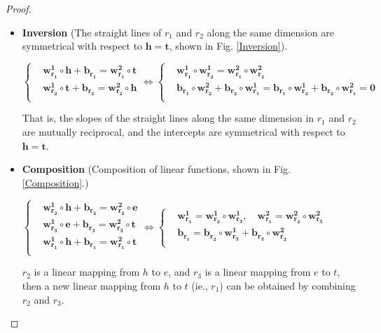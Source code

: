 \documentclass[conference]{IEEEtran}
\begin{document}
\begin{proof}
\begin{itemize}
		\item \textbf{Inversion} (The straight lines of $r_1$ and $r_2$ along the same dimension are symmetrical with respect to $\bm{h} = \bm{t}$, shown in Fig. \ref{Inversion}).
\begin{flushleft}
			$
			\left\{
			\begin{aligned}
			&\bm{w_{r_1}^{1}} \circ \bm{h} + \bm{b_{r_1}} = \bm{w_{r_1}^{2}} \circ \bm{t}  \\
			&\bm{w_{r_2}^{1}} \circ \bm{t} + \bm{b_{r_2}} = \bm{w_{r_2}^{2}} \circ \bm{h}  \\
			\end{aligned}
			\right.
			\Leftrightarrow
			\left\{
			\begin{aligned}
			&\bm{w_{r_1}^{1}} \circ \bm{w_{r_2}^{1}} =	\bm{w_{r_1}^{2}} \circ \bm{w_{r_2}^{2}}  \\
			&\bm{b_{r_1}} \circ \bm{w_{r_2}^{2}} + \bm{b_{r_2}} \circ \bm{w_{r_1}^{1}} = 
			\bm{b_{r_1}} \circ \bm{w_{r_2}^{1}} + \bm{b_{r_2}} \circ \bm{w_{r_1}^{2}} = \bm{0}  \\
			\end{aligned}
			\right.
			$
		\end{flushleft}
That is, the slopes of the straight lines along the same dimension in $r_1$ and $r_2$ are mutually reciprocal, and the intercepts are symmetrical with respect to $\bm{h} = \bm{t}$.
		
		\item \textbf{Composition} (Composition of linear functions, shown in Fig. \ref{Composition}.)
		\begin{flushleft}
			$
			\left\{
			\begin{aligned}
			&\bm{w_{r_2}^{1}} \circ \bm{h} + \bm{b_{r_2}} = \bm{w_{r_2}^{2}} \circ \bm{e}  \\
			&\bm{w_{r_3}^{1}} \circ \bm{e} + \bm{b_{r_3}} = \bm{w_{r_3}^{2}} \circ \bm{t}  \\
			&\bm{w_{r_1}^{1}} \circ \bm{h} + \bm{b_{r_1}} = \bm{w_{r_1}^{2}} \circ \bm{t}  \\
			\end{aligned}
			\right.
			\Leftrightarrow
			\left\{
			\begin{aligned}
			&\bm{w_{r_1}^{1}} = \bm{w_{r_2}^{1}} \circ \bm{w_{r_3}^{1}}, \quad \bm{w_{r_1}^{2}} = \bm{w_{r_2}^{2}} \circ \bm{w_{r_3}^{2}}  \\
			&\bm{b_{r_1}} = \bm{b_{r_2}} \circ \bm{w_{r_3}^{1}} + \bm{b_{r_3}} \circ \bm{w_{r_2}^{2}}  \\
			\end{aligned}
			\right.
			$
		\end{flushleft}
		$r_2$ is a linear mapping from $h$ to $e$, and $r_3$ is a linear mapping from $e$ to $t$, then a new linear mapping from $h$ to $t$ (ie., $r_1$) can be obtained by combining $r_2$ and $r_3$.
	\end{itemize}
\end{proof}
\end{document}
